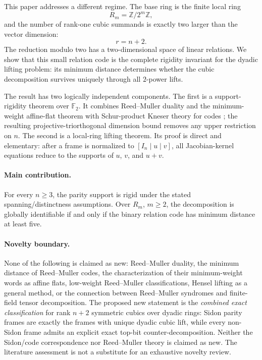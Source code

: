 \documentclass[11pt]{article}
\theoremstyle{definition}
\newcommand{\F}{\mathbb F}
\newcommand{\Z}{\mathbb Z}
\begin{document}
This paper addresses a different regime. The base ring is the finite local ring
\[
R_m=\Z/2^m\Z,
\]
and the number of rank-one cubic summands is exactly two larger than the vector dimension:
\[
r=n+2.
\]
The reduction modulo two has a two-dimensional space of linear relations. We show that this small relation code is the complete rigidity invariant for the dyadic lifting problem: its minimum distance determines whether the cubic decomposition survives uniquely through all \(2\)-power lifts.

The result has two logically independent components. The first is a support-rigidity theorem over \(\F_2\). It combines Reed--Muller duality and the minimum-weight affine-flat theorem \cite{DelsarteNewProof2012} with Schur-product Kneser theory for codes \cite{LinZemor2026}; the resulting projective-triorthogonal dimension bound removes any upper restriction on \(n\). The second is a local-ring lifting theorem. Its proof is direct and elementary: after a frame is normalized to \([I_n\mid u\mid v]\), all Jacobian-kernel equations reduce to the supports of \(u\), \(v\), and \(u+v\).

\paragraph{Main contribution.}
For every \(n\ge3\), the parity support is rigid under the stated spanning/distinctness assumptions. Over \(R_m\), \(m\ge2\), the decomposition is globally identifiable if and only if the binary relation code has minimum distance at least five.

\paragraph{Novelty boundary.}
None of the following is claimed as new: Reed--Muller duality, the minimum distance of Reed--Muller codes, the characterization of their minimum-weight words as affine flats, low-weight Reed--Muller classifications, Hensel lifting as a general method, or the connection between Reed--Muller syndromes and finite-field tensor decomposition. The proposed new statement is the \emph{combined exact classification} for rank \(n+2\) symmetric cubics over dyadic rings: Sidon parity frames are exactly the frames with unique dyadic cubic lift, while every non-Sidon frame admits an explicit exact top-bit counter-decomposition. Neither the Sidon/code correspondence nor Reed--Muller theory is claimed as new. The literature assessment is not a substitute for an exhaustive novelty review.
\end{document}
